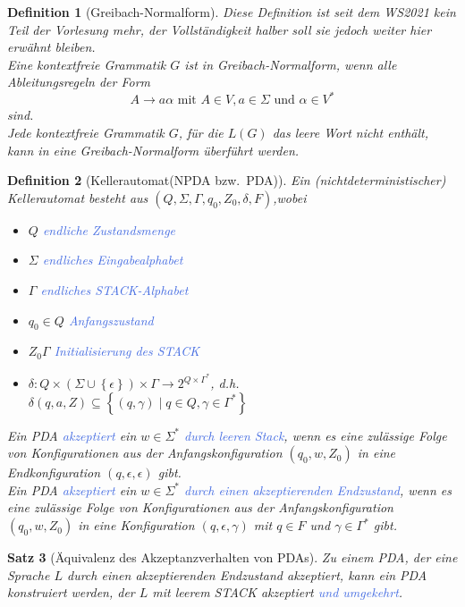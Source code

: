 \documentclass[11pt]{scrartcl}
\newcommand{\tcol}[1]{\textcolor{RoyalBlue}{#1}}
\newcommand{\set}[1]{\left\lbrace #1\right\rbrace}
\theoremstyle{break}
\newtheorem{satz}{Satz}[section]
\newtheorem{defi}[satz]{Definition}
\begin{document}
    \begin{defi}[Greibach-Normalform]
        \textit{Diese Definition ist seit dem WS2021 kein Teil der Vorlesung mehr, der Vollständigkeit halber soll sie jedoch weiter hier erwähnt bleiben.}\\
        Eine kontextfreie Grammatik $G$ ist in Greibach-Normalform, wenn alle Ableitungsregeln der Form
        \[A\rightarrow a\alpha\text{ mit }A\in V,a\in\Sigma\text{ und }\alpha\in V^*\]
        sind.\\
        Jede kontextfreie Grammatik $G$, für die $L(G)$ das leere Wort nicht enthält, kann in eine Greibach-Normalform überführt werden.
    \end{defi}

    \begin{defi}[Kellerautomat(NPDA bzw.\ PDA)]
        Ein (nichtdeterministischer) Kellerautomat besteht aus $(Q,\Sigma,\Gamma,q_0,Z_0,\delta,F)$,wobei
        \begin{itemize}
            \item $Q$ \tcol{endliche Zustandsmenge}
            \item $\Sigma$ \tcol{endliches Eingabealphabet}
            \item $\Gamma$ \tcol{endliches STACK-Alphabet}
            \item $q_0\in Q$ \tcol{Anfangszustand}
            \item $Z_0\Gamma$ \tcol{Initialisierung des STACK}
            \item $\delta\colon Q\times(\Sigma\cup\set{\epsilon})\times\Gamma\to 2^{Q\times\Gamma^*}$, d.h. $\delta(q,a,Z)\subseteq\set{(q,\gamma)\mid q\in Q,\gamma\in\Gamma^*}$
        \end{itemize}
        Ein PDA \tcol{akzeptiert} ein $w\in\Sigma^*$ \tcol{durch leeren Stack}, wenn es eine zulässige Folge von Konfigurationen aus der Anfangskonfiguration $(q_0,w,Z_0)$ in eine Endkonfiguration $(q,\epsilon,\epsilon)$ gibt.\\
        Ein PDA \tcol{akzeptiert} ein $w\in\Sigma^*$ \tcol{durch einen akzeptierenden Endzustand}, wenn es eine zulässige Folge von Konfigurationen aus der Anfangskonfiguration $(q_0,w,Z_0)$ in eine Konfiguration $(q,\epsilon,\gamma)$ mit $q\in F$ und $\gamma\in\Gamma^*$ gibt.
    \end{defi}

    \begin{satz}[Äquivalenz des Akzeptanzverhalten von PDAs]
        Zu einem PDA, der eine Sprache $L$ durch einen akzeptierenden Endzustand akzeptiert, kann ein PDA konstruiert werden, der $L$ mit leerem STACK akzeptiert \tcol{und umgekehrt}.
    \end{satz}
\end{document}
